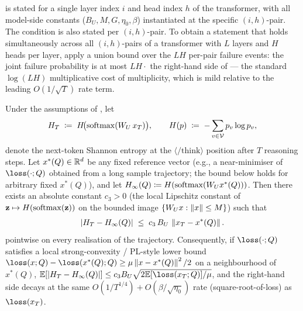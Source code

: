 \begin{remark}\label{rem:per_layer_extension}
 is stated for a single layer index
$i$ and head index $h$ of the transformer, with all model-side constants
($B_U, M, G, \eta_0, \beta$) instantiated at the specific
$(i, h)$-pair. The condition
 is also stated per
$(i, h)$-pair. To obtain a statement that holds simultaneously across
all $(i, h)$-pairs of a transformer with $L$ layers and $H$ heads per
layer, apply a union bound over the $LH$ per-pair failure events: the
joint failure probability is at most $LH \cdot$ the right-hand side of
 — the standard $\log(LH)$ multiplicative
cost of multiplicity, which is mild relative to the leading
$O(1/\sqrt T)$ rate term.
\end{remark}

\begin{corollary}\label{cor:entropy_decay}
Under the assumptions of , let
\begin{align*}
   H_T \;\coloneqq\; H\!\bigl(\operatorname{softmax}(W_U\, x_T)\bigr),
   \qquad
   H(p) \;\coloneqq\; -\sum_{v \in \mathcal V} p_v \log p_v,
\end{align*}
denote the next-token Shannon entropy at the
$\langle/\mathrm{think}\rangle$ position after $T$ reasoning steps. Let
$x^*(Q) \in \mathbb{R}^d$ be any fixed reference vector (e.g., a near-minimiser
of $\loss(\cdot; Q)$ obtained from a long sample trajectory; the bound
below holds for arbitrary fixed $x^*(Q)$), and let
$H_\infty(Q) \coloneqq H(\operatorname{softmax}(W_U x^*(Q)))$. Then there exists an
absolute constant $c_3 > 0$ (the local Lipschitz constant of
$\mathbf z \mapsto H(\operatorname{softmax}(\mathbf z))$ on the bounded image
$\{W_U x : \left\| x \right\| \le M\}$) such that
\begin{align}\label{eq:entropy_decay_pointwise}
   |H_T - H_\infty(Q)|
   \;\le\;
   c_3\, B_U\, \left\| x_T - x^*(Q) \right\|.
\end{align}
pointwise on every realisation of the trajectory. Consequently, if
$\loss(\cdot; Q)$ satisfies a local strong-convexity / PL-style lower
bound $\loss(x; Q) - \loss(x^*(Q); Q) \ge \mu \norm{x - x^*(Q)}^2 / 2$ on
a neighbourhood of $x^*(Q)$,
$\E[|H_T - H_\infty(Q)|] \le c_3 B_U \sqrt{2 \E[\loss(x_T; Q)] / \mu}$,
and the right-hand side decays at the same $O(1/T^{1/4}) + O(\beta/\sqrt{\eta_0})$
rate (square-root-of-loss) as $\loss(x_T)$.
\end{corollary}

